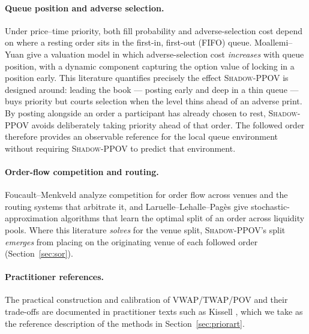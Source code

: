 \documentclass[11pt]{article}
\newcommand{\pov}{\textsc{Shadow-PPOV}}
\begin{document}
\paragraph{Queue position and adverse selection.} Under price--time priority,
both fill probability and adverse-selection cost depend on where a resting
order sits in the first-in, first-out (FIFO) queue. Moallemi--Yuan \cite{moallemi2016} give a
valuation model in which adverse-selection cost \emph{increases} with queue
position, with a dynamic component capturing the option value of locking in a
position early. This literature quantifies precisely the effect \pov{} is
designed around: leading the book --- posting early and deep in a thin queue
--- buys priority but courts selection when the level thins ahead of an adverse
print. By posting alongside an order a participant has already chosen to
rest, \pov{} avoids deliberately taking priority ahead of that order. The
followed order therefore provides an observable reference for the local queue
environment without requiring \pov{} to predict that environment.

\paragraph{Order-flow competition and routing.} Foucault--Menkveld
\cite{foucault2008} analyze competition for order flow across venues and the
routing systems that arbitrate it, and Laruelle--Lehalle--Pag\`es
\cite{laruelle2011} give stochastic-approximation algorithms that learn the
optimal split of an order across liquidity pools. Where this literature
\emph{solves} for the venue split, \pov{}'s split \emph{emerges} from placing
on the originating venue of each followed order (Section~\ref{sec:sor}).

\paragraph{Practitioner references.} The practical construction and calibration
of VWAP/TWAP/POV and their trade-offs are documented in practitioner texts such
as Kissell \cite{kissell}, which we take as the reference description of the
methods in Section~\ref{sec:priorart}.
\end{document}

